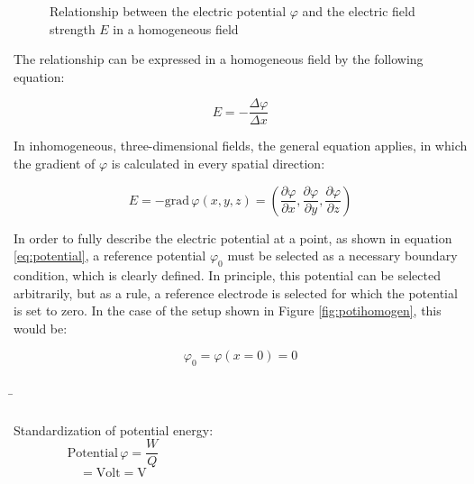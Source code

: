\begin{frame}
{	 \begin{figure}[h!]
		\renewcommand{\figurename}{Figure}
		\centering
		
		\caption{Relationship between the electric potential $\varphi$ and the electric field strength $E$ in a homogeneous field}
		\label{fig:potigraph}
	\end{figure}
	

	 The relationship can be expressed in a homogeneous field by the following equation:

	 \begin{equation}
		E = - \frac{\Delta \varphi}{\Delta x} 
	 \end{equation}

	 In inhomogeneous, three-dimensional fields, the general equation applies, in which the gradient of $\varphi$ is calculated in every spatial direction: 

	 \begin{equation}
		E = - \mathrm{grad} \,\varphi (x,y,z)  = \left( \frac{\partial \varphi}{\partial x}, \frac{\partial \varphi}{\partial y}, \frac{\partial \varphi}{\partial z} \right)
	 \end{equation}


	 In order to fully describe the electric potential at a point, as shown in equation \ref{eq:potential}, 
     a reference potential $\varphi_0$ must be selected as a necessary boundary condition, which is clearly defined. 
     In principle, this potential can be selected arbitrarily, but as a rule, a reference electrode is selected for which the potential
     is set to zero. In the case of the setup shown in Figure \ref{fig:potihomogen}, this would be:


	 \begin{equation*}
		\varphi_0 = \varphi(x=0) = 0
	 \end{equation*}

	}

	\b{
	\begin{columns}
	  \hspace{-2pt}Standardization of potential energy:
	   \begin{equation*}
		\mathrm{Potential} \, \varphi = \frac{W}{Q}
	   \end{equation*}
	   \vspace{-10pt} \begin{equation*}
		[\varphi] = \mathrm{Volt} = \mathrm{V} 
	   \end{equation*}


\end{columns}}
\end{frame}
